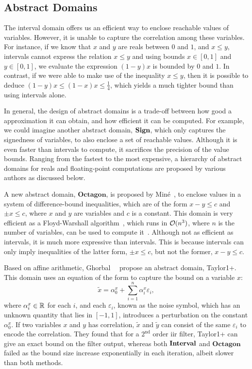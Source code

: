 \subsection{Abstract Domains}
\label{bg:sub:abstract_domains}

The interval domain offers us an efficient way to enclose reachable values
of variables.  However, it is unable to capture the correlation among these
variables.  For instance, if we know that $x$ and $y$ are reals between $0$
and $1$, and $x \leq y$, intervals cannot express the relation $x \leq y$ and
using bounds $x \in [0, 1]$ and $y \in [0, 1]$, we evaluate the expression $(1
- y)x$ is bounded by $0$ and $1$.  In contrast, if we were able to make use of
the inequality $x \leq y$, then it is possible to deduce $(1 - y) x \leq (1 -
x) x \leq \frac{1}{4}$, which yields a much tighter bound than using intervals
alone.

In general, the design of abstract domains is a trade-off between how good
a approximation it can obtain, and how efficient it can be computed.  For
example, we could imagine another abstract domain, $\mathbf{Sign}$, which only
captures the signedness of variables, to also enclose a set of reachable
values.  Although it is even faster than intervals to compute, it sacrifices
the precision of the value bounds.  Ranging from the fastest to the most
expensive, a hierarchy of abstract domains for reals and floating-point
computations are proposed by various authors as discussed below.

A new abstract domain, $\mathbf{Octagon}$, is proposed by Min\'e~\cite{mine07},
to enclose values in a system of difference-bound inequalities, which are of
the form $x - y \leq c$ and $\pm x \leq c$, where $x$ and $y$ are variables
and $c$ is a constant.  This domain is very efficient as a Floyd-Warshall
algorithm~\cite{floyd62}, which runs in $\operatorname{\mathcal{O}}(n^3)$, where $n$ is the number
of variables, can be used to compute it~\cite{mine04}.  Although not as
efficient as intervals, it is much more expressive than intervals.  This is
because intervals can only imply inequalities of the latter form, $\pm x \leq
c$, but not the former, $x - y \leq c$.

Based on affine arithmetic, Ghorbal~\etal~\cite{ghorbal09} propose an abstract
domain, Taylor1+\@.  This domain uses an equation of the form to capture the
bound on a variable $x$:
\begin{equation}
    \tilde{x} = \alpha^x_0 + \sum_{i = 1}^{n} \alpha^x_i \varepsilon_i,
\end{equation}
where $\alpha^x_i \in \mathbb{R}$ for each $i$, and each $\varepsilon_i$, known
as the noise symbol, which has an unknown quantity that lies in $[-1, 1]$,
introduces a perturbation on the constant $\alpha^x_0$.  If two variables
$x$ and $y$ has correlation, $\tilde{x}$ and $\tilde{y}$ can consist of
the same $\varepsilon_i$ to encode the correlation.  They found that for a
$2^\mathrm{nd}$ order \gls{iir} filter, Taylor1+ can give an exact bound on the
filter output, whereas both $\mathbf{Interval}$ and $\mathbf{Octagon}$ failed as the
bound size increase exponentially in each iteration, albeit slower than both
methods.

